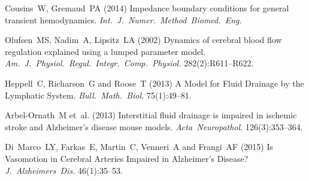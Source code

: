 \documentclass[a4paper,titlepage]{scrartcl}
\begin{document}
\begin{thebibliography}{10}
Cousins~W, Gremaud~PA (2014) Impedance boundary conditions for general transient hemodynamics. {\em Int.~J.~Numer.~Method~Biomed.~Eng.}
  
Olufsen~MS, Nadim~A, Lipsitz~LA (2002) Dynamics of cerebral blood flow regulation explained using a lumped parameter model. {\em Am.~J.~Physiol.~Regul.~Integr.~Comp.~Physiol.} 282(2):R611--R622.



Heppell~C, Richarson~G and Roose~T (2013) A Model for Fluid Drainage by the Lymphatic System. {\em Bull.~Math.~Biol.} 75(1):49--81.

Arbel-Ornath~M et~al. (2013) Interstitial fluid drainage is impaired in ischemic stroke and Alzheimer's disease mouse models. {\em Acta~Neuropathol.} 126(3):353--364.

Di~Marco~LY, Farkas~E, Martin~C, Venneri~A and Frangi~AF (2015) Is Vasomotion in Cerebral Arteries Impaired in Alzheimer's Disease? {\em J.~Alzheimers~Dis.} 46(1):35--53.
\end{thebibliography}
\end{document}
